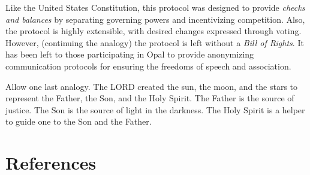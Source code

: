 \documentclass[10pt,twocolumn]{article}
\begin{document}
Like the United States Constitution, this protocol was designed to provide {\em checks and balances} by separating governing powers and incentivizing competition.  Also, the protocol is highly extensible, with desired changes expressed through voting.  However, (continuing the analogy) the protocol is left without a {\em Bill of Rights}.  It has been left to those participating in Opal to provide anonymizing communication protocols for ensuring the freedoms of speech and association.

Allow one last analogy.  The LORD created the sun, the moon, and the stars to represent the Father, the Son, and the Holy Spirit.  The Father is the source of justice.  The Son is the source of light in the darkness.  The Holy Spirit is a helper to guide one to the Son and the Father.

\section{References}


\end{document}
